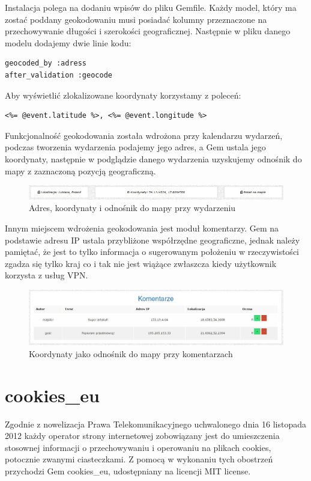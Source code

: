 \documentclass[openright]{xmgr}
\begin{document}
Instalacja polega na dodaniu wpisów do pliku Gemfile. Każdy model, który ma zostać poddany geokodowaniu musi posiadać kolumny przeznaczone na przechowywanie długości i szerokości geograficznej. Następnie w pliku danego modelu dodajemy dwie linie kodu: 
\begin{lstlisting}[language=ruby2, caption={Kod odpowiadający za geokodowanie}]
geocoded_by :adress 
after_validation :geocode
\end{lstlisting}
Aby wyświetlić zlokalizowane koordynaty korzystamy z poleceń:
\begin{lstlisting}[language=ruby2, caption={Kod wyświetlający koordynaty}]
<%= @event.latitude %>, <%= @event.longitude %> 
\end{lstlisting}
Funkcjonalność geokodowania została wdrożona przy kalendarzu wydarzeń, podczas tworzenia wydarzenia podajemy jego adres, a Gem ustala jego koordynaty, następnie w podglądzie danego wydarzenia uzyskujemy odnośnik do mapy z zaznaczoną pozycją geograficzną.

\begin{figure}[!tbh]
\centering
\includegraphics[width=\linewidth]{fig/geocoder-events}
\caption{Adres, koordynaty i odnośnik do mapy przy wydarzeniu}
\end{figure}

Innym miejscem wdrożenia geokodowania jest moduł komentarzy. Gem na podstawie adresu IP ustala przybliżone współrzędne geograficzne, jednak należy pamiętać, że jest to tylko informacja o sugerowanym położeniu w rzeczywistości zgadza się tylko kraj co i tak nie jest wiążące zwłaszcza kiedy użytkownik korzysta z usług VPN.

\begin{figure}[!tbh]
\centering
\includegraphics[width=\linewidth]{fig/geocoder-comments}
\caption{Koordynaty jako odnośnik do mapy przy komentarzach}
\end{figure}

\newpage

\section{cookies\_eu}
Zgodnie z nowelizacja Prawa Telekomunikacyjnego uchwalonego dnia 16 listopada 2012 każdy operator strony internetowej zobowiązany jest do umieszczenia stosownej informacji o przechowywaniu i operowaniu na plikach cookies, potocznie zwanymi ciasteczkami. Z pomocą w wykonaniu tych obostrzeń przychodzi Gem cookies\_eu\cite{cookies}, udostępniany na licencji MIT license. 
\end{document}
